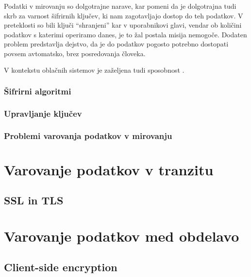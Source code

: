 \documentclass[12pt,a4paper,openany]{book}
\begin{document}
Podatki v mirovanju so dolgotrajne narave, kar pomeni da je dolgotrajna tudi skrb za varnost šifrirnih ključev, ki nam zagotavljajo dostop do teh podatkov. V preteklosti so bili ključi ``shranjeni'' kar v uporabnikovi glavi, vendar ob količini podatkov s katerimi operiramo danes, je to žal postala misija nemogoče. Dodaten problem predstavlja dejstvo, da je do podatkov pogosto potrebno dostopati povsem avtomatsko, brez posredovanja človeka.

V kontekstu oblačnih sistemov je zaželjena tudi sposobnost .


\subsubsection{Šifrirni algoritmi}
\label{subs:Šifrirni algoritmi}

\subsubsection{Upravljanje ključev}
\label{subs:Upravljanje ključev}

\subsubsection{Problemi varovanja podatkov v mirovanju}
\label{subs:Problemi varovanja podatkov v mirovanju}

\section{Varovanje podatkov v tranzitu}
\label{sec:Varovanje podatkov v tranzitu}

\subsection{SSL in TLS}
\label{sub:SSL in TLS}


\section{Varovanje podatkov med obdelavo}
\label{sec:Varovanje podatkov med obdelavo}



\subsection{Client-side encryption}
\end{document}
